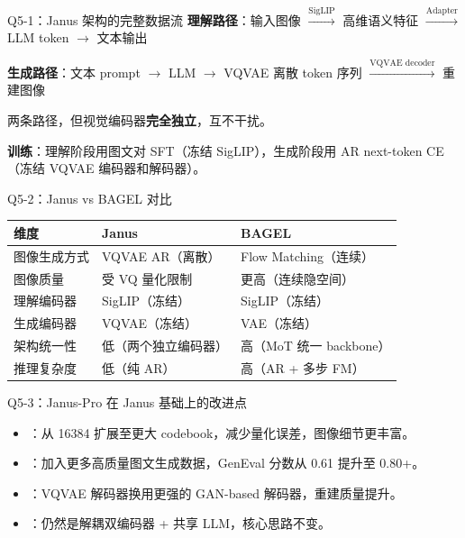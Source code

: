 \begin{conceptbox}{Q5-1：Janus 架构的完整数据流}
\textbf{理解路径}：输入图像 $\xrightarrow{\text{SigLIP}}$ 高维语义特征 $\xrightarrow{\text{Adapter}}$ LLM token $\to$ 文本输出

\textbf{生成路径}：文本 prompt $\to$ LLM $\to$ VQVAE 离散 token 序列 $\xrightarrow{\text{VQVAE decoder}}$ 重建图像

两条路径，但视觉编码器\textbf{完全独立}，互不干扰。

\textbf{训练}：理解阶段用图文对 SFT（冻结 SigLIP），生成阶段用 AR next-token CE（冻结 VQVAE 编码器和解码器）。
\end{conceptbox}

\begin{conceptbox}{Q5-2：Janus vs BAGEL 对比}
\begin{center}
\small
\begin{tabular}{|l|l|l|}
\hline
\textbf{维度} & \textbf{Janus} & \textbf{BAGEL} \\
\hline
图像生成方式 & VQVAE AR（离散） & Flow Matching（连续） \\
图像质量 & 受 VQ 量化限制 & 更高（连续隐空间） \\
理解编码器 & SigLIP（冻结） & SigLIP（冻结） \\
生成编码器 & VQVAE（冻结） & VAE（冻结） \\
架构统一性 & 低（两个独立编码器） & 高（MoT 统一 backbone） \\
推理复杂度 & 低（纯 AR） & 高（AR + 多步 FM） \\
\hline
\end{tabular}
\end{center}
\end{conceptbox}

\begin{conceptbox}{Q5-3：Janus-Pro 在 Janus 基础上的改进点}
\begin{itemize}
  \item {}：从 16384 扩展至更大 codebook，减少量化误差，图像细节更丰富。
  \item {}：加入更多高质量图文生成数据，GenEval 分数从 0.61 提升至 0.80+。
  \item {}：VQVAE 解码器换用更强的 GAN-based 解码器，重建质量提升。
  \item {}：仍然是解耦双编码器 + 共享 LLM，核心思路不变。
\end{itemize}
\end{conceptbox}

